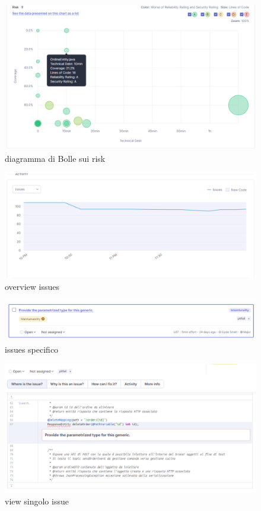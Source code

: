 \begin{figure}[htbp]
	\centering
	\includegraphics[scale=0.50]{iterazione1/images/risk.png}
	\caption{diagramma di Bolle sui risk\label{fig:risk}}
\end{figure}

\begin{figure}[htbp]
	\centering
	\includegraphics[scale=0.50]{iterazione1/images/issues.png}
	\caption{overview issues\label{fig:issues}}
\end{figure}

\begin{figure}[htbp]
	\centering
	\includegraphics[scale=0.50]{iterazione1/images/visione_issue.png}
	\caption{issues specifico\label{fig:visione issues}}
\end{figure}

\begin{figure}[htbp]
	\centering
	\includegraphics[scale=0.50]{iterazione1/images/esempio_issue.png}
	\caption{view singolo issue\label{fig:esempio issue}}
\end{figure}

